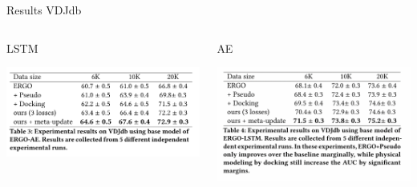 \documentclass[aspectratio=1610,xcolor={dvipsnames},hyperref={colorlinks,unicode,linkcolor=violet,anchorcolor=blueviolet,citecolor=YellowOrange,filecolor=black,urlcolor=Aquamarine}]{beamer}
\begin{document}
\begin{frame}[label={sec:orgac7d944}]{Results VDJdb}
\begin{columns}
\begin{column}{0.4\columnwidth}
\begin{block}{LSTM}
\begin{center}
\includegraphics[width=.9\linewidth]{./p6.png}
\end{center}
\end{block}
\end{column}

\begin{column}{0.4\columnwidth}
\begin{block}{AE}
\begin{center}
\includegraphics[width=.9\linewidth]{./p7.png}
\end{center}
\end{block}
\end{column}
\end{columns}
\end{frame}
\end{document}
